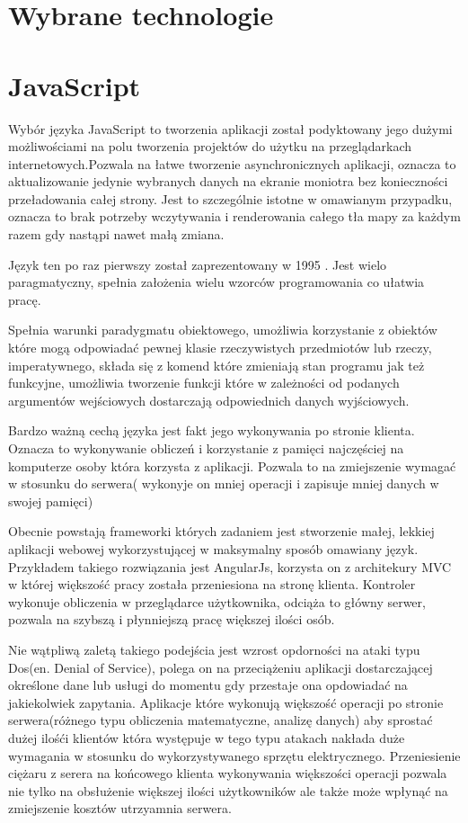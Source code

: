 \section{Wybrane technologie}
\label{sec:wybranetechnologie}

\section{JavaScript}
\label{sec:javascript}

Wybór języka JavaScript to tworzenia aplikacji został podyktowany jego dużymi możliwościami na polu tworzenia projektów do użytku na przeglądarkach internetowych.Pozwala na łatwe tworzenie asynchronicznych aplikacji, oznacza to aktualizowanie jedynie wybranych danych na ekranie moniotra bez konieczności przeładowania całej strony. Jest to szczególnie istotne w omawianym przypadku, oznacza to brak potrzeby wczytywania i renderowania całego tła mapy za każdym razem gdy nastąpi nawet małą zmiana.

Język ten po raz pierwszy został zaprezentowany w 1995 \cite{js1995}. Jest wielo paragmatyczny, spełnia założenia wielu wzorców programowania co ułatwia pracę.

Spełnia warunki paradygmatu obiektowego, umożliwia korzystanie z obiektów które mogą odpowiadać pewnej klasie rzeczywistych przedmiotów lub rzeczy, imperatywnego, składa się z komend które zmieniają stan programu jak też funkcyjne, umożliwia tworzenie funkcji które w zależności od podanych argumentów wejściowych dostarczają odpowiednich danych wyjściowych.

Bardzo ważną cechą języka jest fakt jego wykonywania po stronie klienta. Oznacza to wykonywanie obliczeń i korzystanie z pamięci najczęściej na komputerze osoby która korzysta z aplikacji. Pozwala to na zmiejszenie wymagać w stosunku do serwera( wykonyje on mniej operacji i zapisuje mniej danych w swojej pamięci)

Obecnie powstają frameworki których zadaniem jest stworzenie małej, lekkiej aplikacji webowej wykorzystującej w maksymalny sposób omawiany język.\cite{AngularJS} Przykładem takiego rozwiązania jest AngularJs, korzysta on z architekury MVC w której większość pracy została przeniesiona na stronę klienta. Kontroler wykonuje obliczenia w przeglądarce użytkownika, odciąża to główny serwer, pozwala na szybszą i płynniejszą pracę większej ilości osób.

Nie wątpliwą zaletą takiego podejścia jest wzrost opdorności na ataki typu Dos(en. Denial of Service), polega on na przeciążeniu aplikacji dostarczającej określone dane lub usługi do momentu gdy przestaje ona opdowiadać na jakiekolwiek zapytania. Aplikacje które wykonują większość operacji po stronie serwera(różnego typu obliczenia matematyczne, analizę danych) aby sprostać dużej ilośći klientów która występuje w tego typu atakach nakłada duże wymagania w stosunku do wykorzystywanego sprzętu elektrycznego. Przeniesienie ciężaru z serera na końcowego klienta wykonywania większości operacji pozwala nie tylko na obsłużenie większej ilości użytkowników ale także może wpłynąć na zmiejszenie kosztów utrzyamnia serwera.

